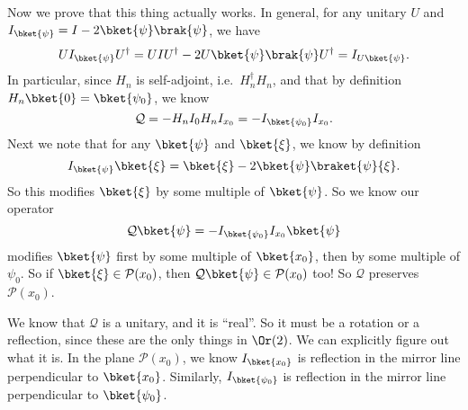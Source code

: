 \documentclass[a4paper]{article}
\begin{document}
Now we prove that this thing actually works. In general, for any unitary $U$ and $I_{\bket{\psi}} = I - 2 \bket{\psi}\brak{\psi}$, we have
\[
  UI_{\bket{\psi}}U^\dagger = UIU^\dagger - 2U \bket{\psi} \brak{\psi} U^\dagger = I_{U \bket{\psi}}.
\]
In particular, since $H_n$ is self-adjoint, i.e.\ $H_n^\dagger H_n$, and that by definition $H_n \bket{0} = \bket{\psi_0}$, we know
\[
  \mathcal{Q} = -H_n I_0 H_n I_{x_0} = -I_{\bket{\psi_0}} I_{x_0}.
\]
Next we note that for any $\bket{\psi}$ and $\bket{\xi}$, we know by definition
\[
  I_{\bket{\psi}}\bket{\xi} = \bket{\xi} - 2 \bket{\psi} \braket{\psi}{\xi}.
\]
So this modifies $\bket{\xi}$ by some multiple of $\bket{\psi}$. So we know our operator
\[
  \mathcal{Q}\bket{\psi} = -I_{\bket{\psi_0}} I_{x_0}\bket{\psi}
\]
modifies $\bket{\psi}$ first by some multiple of $\bket{x_0}$, then by some multiple of $\psi_0$. So if $\bket{\xi} \in \mathcal{P}(x_0)$, then $\mathcal{Q} \bket{\psi} \in \mathcal{P}(x_0)$ too! So $\mathcal{Q}$ preserves $\mathcal{P}(x_0)$.

We know that $\mathcal{Q}$ is a unitary, and it is ``real''. So it must be a rotation or a reflection, since these are the only things in $\Or(2)$. We can explicitly figure out what it is. In the plane $\mathcal{P}(x_0)$, we know $I_{\bket{x_0}}$ is reflection in the mirror line perpendicular to $\bket{x_0}$. Similarly, $I_{\bket{\psi_0}}$ is reflection in the mirror line perpendicular to $\bket{\psi_0}$.
\end{document}
